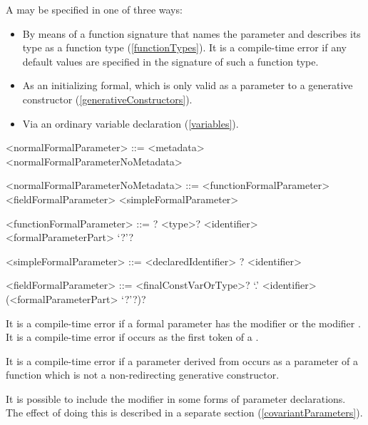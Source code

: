 \documentclass[makeidx]{article}
\begin{document}
\LMHash{}%
A  may be specified in one of three ways:
\begin{itemize}
\item By means of a function signature that names the parameter and describes its type as a function type (\ref{functionTypes}).
It is a compile-time error if any default values are specified in the signature of such a function type.%
\item As an initializing formal, which is only valid as a parameter to a generative constructor (\ref{generativeConstructors}). %
\item Via an ordinary variable declaration (\ref{variables}).
\end{itemize}

\begin{grammar}
<normalFormalParameter> ::= \gnewline{}
  <metadata> <normalFormalParameterNoMetadata>

<normalFormalParameterNoMetadata> ::= <functionFormalParameter>
  \alt <fieldFormalParameter>
  \alt <simpleFormalParameter>

<functionFormalParameter> ::= \gnewline{}
  \COVARIANT{}? <type>? <identifier> <formalParameterPart> `?'?

<simpleFormalParameter> ::= <declaredIdentifier>
  \alt \COVARIANT{}? <identifier>

<fieldFormalParameter> ::= \gnewline{}
  <finalConstVarOrType>? \THIS{} `.' <identifier> (<formalParameterPart> `?'?)?
\end{grammar}

\LMHash{}%
It is a compile-time error if a formal parameter has the modifier \CONST{}
or the modifier \LATE.
It is a compile-time error if \VAR{} occurs as
the first token of a .

\LMHash{}%
It is a compile-time error if a parameter derived from
 occurs as a parameter of a function
which is not a non-redirecting generative constructor.


\LMHash{}%
It is possible to include the modifier \COVARIANT{}
in some forms of parameter declarations.
The effect of doing this is described in a separate section
(\ref{covariantParameters}).
\end{document}
